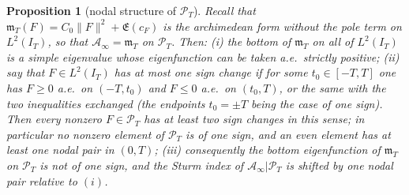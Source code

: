\documentclass[11pt]{amsart}
\newtheorem{proposition}[theorem]{Proposition}
\theoremstyle{definition}
\theoremstyle{remark}
\newcommand{\PT}{\mathcal P_T}
\newcommand{\IT}{I_T}
\newcommand{\cF}{c_F}
\newcommand{\Lev}{\mathfrak E}
\newcommand{\Ainf}{\mathcal A_\infty}
\newcommand{\mT}{\mathfrak m_T}
\begin{document}
\begin{proposition}[nodal structure of $\PT$]\label{prop:nodes}
Recall that $\mT(F)=C_0\|F\|^2+\Lev(\cF)$ is the archimedean form without the pole term on
$L^2(\IT)$, so that $\Ainf=\mT$ on $\PT$. Then:
\emph{(i)} the bottom of $\mT$ on all of $L^2(\IT)$ is a simple eigenvalue whose
eigenfunction can be taken a.e.\ strictly positive;
\emph{(ii)} say that $F\in L^2(\IT)$ has \emph{at most one sign change} if for some
$t_0\in[-T,T]$ one has $F\ge0$ a.e.\ on $(-T,t_0)$ and $F\le0$ a.e.\ on $(t_0,T)$, or the same
with the two inequalities exchanged (the endpoints $t_0=\pm T$ being the case of one sign).
Then every nonzero $F\in\PT$ has at least two sign changes in this sense; in particular no
nonzero element of $\PT$ is of one sign, and an even element has at least one nodal pair in
$(0,T)$;
\emph{(iii)} consequently the bottom eigenfunction of $\mT$ on $\PT$ is not of one sign,
and the Sturm index of $\Ainf|\PT$ is shifted by one nodal pair relative to $(i)$.
\end{proposition}
\end{document}
